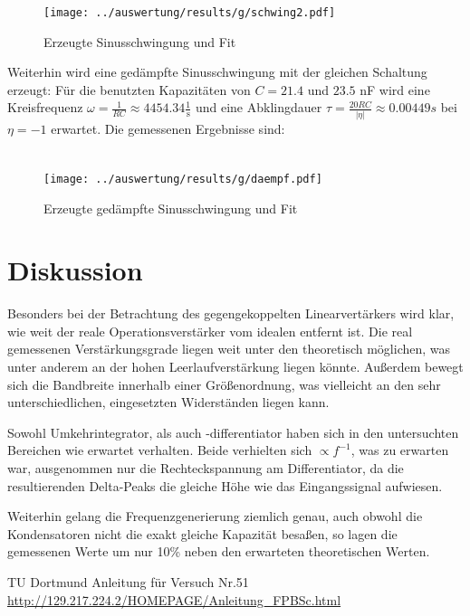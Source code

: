 \begin{figure}
	\centering
	\texttt{[image: ../auswertung/results/g/schwing2.pdf]}
	\caption{Erzeugte Sinusschwingung und Fit}
	\label{pic:g schwing}
\end{figure}

Weiterhin wird eine gedämpfte Sinusschwingung mit der gleichen Schaltung erzeugt: Für die benutzten Kapazitäten von $C = 21.4$ und $23.5$ nF wird eine Kreisfrequenz $\omega = \frac{1}{RC} \approx 4454.34 \frac{1}{\si{\second}}$ und eine Abklingdauer $\tau = \frac{20RC}{|\eta|} \approx 0.00449 \si{s}$ bei $\eta = -1$ erwartet. Die gemessenen Ergebnisse sind:

\begin{align*}
	
\end{align*}

\begin{figure}
	\centering
	\texttt{[image: ../auswertung/results/g/daempf.pdf]}
	\caption{Erzeugte gedämpfte Sinusschwingung und Fit}
\end{figure}


\section{Diskussion}
Besonders bei der Betrachtung des gegengekoppelten Linearvertärkers wird klar, wie weit der reale Operationsverstärker vom idealen entfernt ist. Die real gemessenen Verstärkungsgrade liegen weit unter den theoretisch möglichen, was unter anderem an der hohen Leerlaufverstärkung liegen könnte. Außerdem bewegt sich die Bandbreite innerhalb einer Größenordnung, was vielleicht an den sehr unterschiedlichen, eingesetzten Widerständen liegen kann.

Sowohl Umkehrintegrator, als auch -differentiator haben sich in den untersuchten Bereichen wie erwartet verhalten. Beide verhielten sich $\propto f^{-1}$, was zu erwarten war, ausgenommen nur die Rechteckspannung am Differentiator, da die resultierenden Delta-Peaks die gleiche Höhe wie das Eingangssignal aufwiesen.

Weiterhin gelang die Frequenzgenerierung ziemlich genau, auch obwohl die Kondensatoren nicht die exakt gleiche Kapazität  besaßen, so lagen die gemessenen Werte um nur 10\% neben den erwarteten theoretischen Werten.

\newpage
 \begin{thebibliography}{WissOnl}
 	 TU Dortmund Anleitung für Versuch Nr.51 \url{http://129.217.224.2/HOMEPAGE/Anleitung_FPBSc.html}
 	\end{thebibliography}




